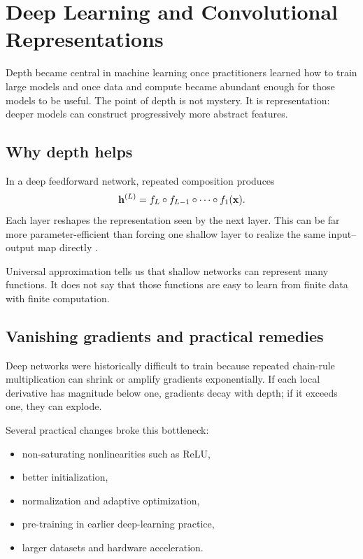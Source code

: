 \chapter{Deep Learning and Convolutional Representations}

Depth became central in machine learning once practitioners learned how to train large models and once data and compute became abundant enough for those models to be useful. The point of depth is not mystery. It is representation: deeper models can construct progressively more abstract features.

\section{Why depth helps}

In a deep feedforward network, repeated composition produces
\[
  \mathbf{h}^{(L)}
  =
  f_L \circ f_{L-1} \circ \cdots \circ f_1(\mathbf{x}).
\]
Each layer reshapes the representation seen by the next layer. This can be far more parameter-efficient than forcing one shallow layer to realize the same input--output map directly \parencite{goodfellow2016deep,hastie2009elements}.

\begin{aside}
Universal approximation tells us that shallow networks can represent many functions. It does not say that those functions are easy to learn from finite data with finite computation.
\end{aside}

\section{Vanishing gradients and practical remedies}

Deep networks were historically difficult to train because repeated chain-rule multiplication can shrink or amplify gradients exponentially. If each local derivative has magnitude below one, gradients decay with depth; if it exceeds one, they can explode.

Several practical changes broke this bottleneck:
\begin{itemize}
  \item non-saturating nonlinearities such as ReLU,
  \item better initialization,
  \item normalization and adaptive optimization,
  \item pre-training in earlier deep-learning practice,
  \item larger datasets and hardware acceleration.
\end{itemize}

